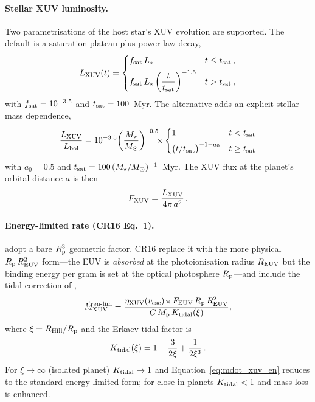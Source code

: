 \documentclass{aastex701}
\newcommand{\Mdot}{\dot{M}}
\newcommand{\Mp}{M_{\rm p}}
\newcommand{\Rp}{R_{\rm p}}
\newcommand{\Lxuv}{L_{\rm XUV}}
\newcommand{\Fxuv}{F_{\rm XUV}}
\begin{document}
\paragraph{Stellar XUV luminosity.}  Two parametrisations of the host
star's XUV evolution are supported.  The default
\citep[\texttt{xuv\_evolution\_model = ribas05},][]{Ribas2005} is a
saturation plateau plus power-law decay,
\begin{equation}\label{eq:Lxuv}
  \Lxuv(t) =
  \begin{cases}
    f_{\rm sat}\,L_{\star}
      & t \le t_{\rm sat}\,,\\[4pt]
    f_{\rm sat}\,L_{\star}
      \left(\dfrac{t}{t_{\rm sat}}\right)^{-1.5}
      & t > t_{\rm sat}\,,
  \end{cases}
\end{equation}
with $f_{\rm sat} = 10^{-3.5}$ and $t_{\rm sat} = 100$~Myr.  The
alternative \citep[\texttt{xuv\_evolution\_model = rogers21},
following][]{Rogers2021} adds an explicit stellar-mass dependence,
\begin{equation}\label{eq:Lxuv_rogers}
  \frac{\Lxuv}{L_{\rm bol}}
    = 10^{-3.5}\!\left(\frac{M_{\star}}{M_{\odot}}\right)^{\!-0.5}
      \!\!\!\times
      \begin{cases}
        1 & t < t_{\rm sat}\\[4pt]
        \bigl(t/t_{\rm sat}\bigr)^{-1-a_{0}} & t \ge t_{\rm sat}
      \end{cases}
\end{equation}
with $a_{0} = 0.5$ and
$t_{\rm sat} = 100\,(M_{\star}/M_{\odot})^{-1}$~Myr.  The XUV flux at
the planet's orbital distance $a$ is then
\begin{equation}\label{eq:Fxuv}
  \Fxuv = \frac{\Lxuv}{4\pi\,a^{2}}\,.
\end{equation}

\paragraph{Energy-limited rate (CR16 Eq.~1).}  \citet{Lopez2013} adopt
a bare $\Rp^{3}$ geometric factor.  CR16 replace it with the more physical
$\Rp\,R_{\rm EUV}^{2}$ form---the EUV is \emph{absorbed} at the
photoionisation radius $R_{\rm EUV}$ but the binding energy per gram
is set at the optical photosphere $\Rp$---and include the tidal
correction of \citet{Erkaev2007},
\begin{equation}\label{eq:mdot_xuv_en}
  \Mdot_{\rm XUV}^{\rm en\text{-}lim}
    = \frac{\eta_{\rm XUV}(v_{\rm esc})\,
            \pi\,F_{\rm EUV}\,\Rp\,R_{\rm EUV}^{2}}
           {G\,\Mp\,K_{\rm tidal}(\xi)},
\end{equation}
where $\xi = R_{\rm Hill}/\Rp$ and the Erkaev tidal factor is
\begin{equation}\label{eq:Ktidal}
  K_{\rm tidal}(\xi) = 1 - \frac{3}{2\xi} + \frac{1}{2\xi^{3}}\,.
\end{equation}
For $\xi \to \infty$ (isolated planet) $K_{\rm tidal}\to 1$ and
Equation~\eqref{eq:mdot_xuv_en} reduces to the standard
energy-limited form; for close-in planets $K_{\rm tidal} < 1$ and
mass loss is enhanced.
\end{document}
